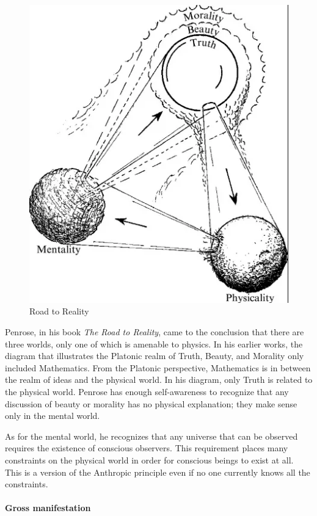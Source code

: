 \begin{figure}
\includegraphics[scale=.35]{a20221106SacredScience107TheHeartoftheMatter-img001.png} 
\caption{Road to Reality}
\end{figure}

Penrose, in his book \emph{The Road to Reality}, came to the conclusion that there are three worlds, only one of which is amenable to physics. In his earlier works, the diagram that illustrates the Platonic realm of Truth, Beauty, and Morality only included Mathematics. From the Platonic perspective, Mathematics is in between the realm of ideas and the physical world. In his diagram, only Truth is related to the physical world. Penrose has enough self-awareness to recognize that any discussion of beauty or morality has no physical explanation; they make sense only in the mental world.

As for the mental world, he recognizes that any universe that can be observed requires the existence of conscious observers. This requirement places many constraints on the physical world in order for conscious beings to exist at all. This is a version of the Anthropic principle even if no one currently knows all the constraints.

\paragraph{Gross manifestation}

